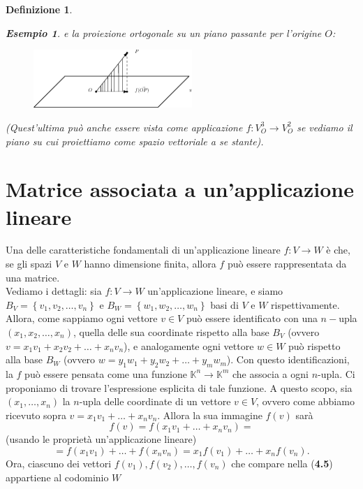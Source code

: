 \message{ !name(algebraegeometria.tex)}\documentclass{book}
\newtheorem{definizione}{Definizione}
\newtheorem{esempio}{Esempio}
\begin{document}
\begin{definizione}
\begin{esempio}
    e la proiezione ortogonale su un piano passante per l'origine $O$:
    \begin{figure}[th]
      \centering
        \includegraphics[width=6cm]{img/finiti/imgex4-2-10.eps}
    \end{figure}
    (Quest'ultima può anche essere vista come applicazione $f:V_O^3\to V_O^2$ se vediamo il piano su cui
    proiettiamo come spazio vettoriale a se stante).
  \end{esempio}
\end{definizione}

\section{Matrice associata a un'applicazione lineare}
Una delle caratteristiche fondamentali di un'applicazione lineare $f:V\to W$ è che, se gli spazi $V$ e $W$ hanno
dimensione finita, allora $f$ può essere rappresentata da una matrice.\\ Vediamo i dettagli: sia $f:V\to W$
un'applicazione lineare, e siamo $B_V=\left\{v_1,v_2,\dots,v_n\right\}$ e $B_W=\left\{w_1,w_2,\dots,w_n\right\}$
basi di $V$ e $W$ rispettivamente. Allora, come sappiamo ogni vettore $v\in V$ può essere identificato con una
$n-$upla $\left(x_1,x_2,\dots,x_n\right)$, quella delle sua coordinate rispetto alla base $B_V$ (ovvero
$v=x_1v_1+x_2v_2+\dots+x_nv_n$), e analogamente ogni vettore $w\in W$ può rispetto alla base $B_W$ (ovvero
$w=y_1w_1+y_2w_2+\dots+y_mw_m$). Con questo identificazioni, la $f$ può essere pensata come una funzione
$\mathds{K}^n\to\mathds{K}^m$ che associa a ogni $n$-upla. Ci proponiamo di trovare l'espressione esplicita di
tale funzione. A questo scopo, sia $(x_1,\dots,x_n)$ la $n$-upla delle coordinate di un vettore $v\in V$, ovvero
come abbiamo ricevuto sopra $v=x_1v_1+\dots+x_nv_n$. Allora la sua immagine $f(v)$ sarà
\begin{equation*}
  f(v)=f(x_1v_1+\dots+x_nv_n) =
\end{equation*}
(usando le proprietà un'applicazione lineare)
\begin{equation}
  =f(x_1v_1)+\dots+f(x_nv_n)=x_1f(v_1)+\dots+x_nf(v_n).
\end{equation}
Ora, ciascuno dei vettori $f(v_1),f(v_2),\dots,f(v_n)$ che compare nella ({\bf 4.5}) appartiene al codominio $W$
\end{document}
